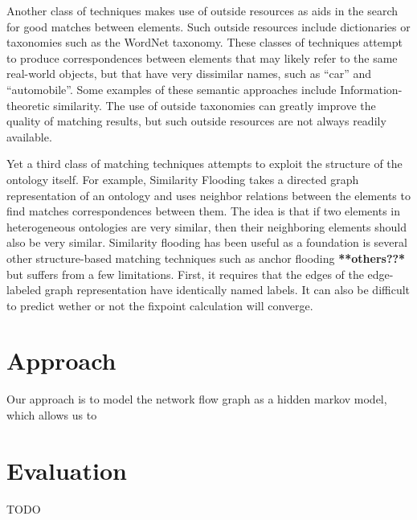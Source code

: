 \documentclass[letterpaper,twocolumn,10pt]{article}
\begin{document}
Another class of techniques makes use of outside resources as aids in the search for
good matches between elements. Such outside resources include dictionaries or taxonomies
such as the WordNet taxonomy. These classes of techniques attempt to produce correspondences
between elements that may likely refer to the same real-world objects, but that have very
dissimilar names, such as ``car'' and ``automobile''. Some examples of these semantic 
approaches include Information-theoretic similarity.
%
The use of outside taxonomies can greatly improve the quality of matching results,
but such outside resources are not always readily available.

Yet a third class of matching techniques attempts to exploit the structure of the ontology
itself. For example, Similarity Flooding takes a directed graph representation of an 
ontology and uses neighbor relations between the elements to find matches correspondences
between them. The idea is that if two elements in heterogeneous ontologies are very similar,
then their neighboring elements should also be very similar.
%
Similarity flooding has been useful as a foundation is several other structure-based
matching techniques such as anchor flooding \textbf{**others??*} but suffers from 
a few limitations. First, it requires that the edges of the edge-labeled graph 
representation have identically named labels. It can also be difficult to predict
wether or not the fixpoint calculation will converge.
\newline


\section{Approach}
Our approach is to model the network flow graph as a hidden markov model, which allows us to


\section{Evaluation}
TODO
\end{document}
